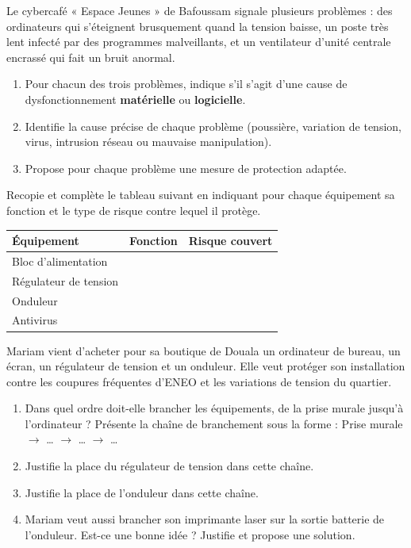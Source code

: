 \documentclass[11pt]{article}
\newcounter{popsec}
\newcounter{popsub}
\newcommand{\courssub}[1]{%
  \stepcounter{popsub}%
  \par\vspace{9pt}\noindent{\popxbold\fontsize{11.5}{13}\selectfont\color{popink}{\color{poporange}\thepopsec.\thepopsub}\hspace{6pt}#1}\par\nopagebreak\vspace{4pt}
}
\begin{document}
\courssub{Je m'entraîne}

\begin{exercice}
Le cybercafé « Espace Jeunes » de Bafoussam signale plusieurs problèmes : des ordinateurs qui s'éteignent brusquement quand la tension baisse, un poste très lent infecté par des programmes malveillants, et un ventilateur d'unité centrale encrassé qui fait un bruit anormal.
\begin{enumerate}
\item Pour chacun des trois problèmes, indique s'il s'agit d'une cause de dysfonctionnement \textbf{matérielle} ou \textbf{logicielle}.
\item Identifie la cause précise de chaque problème (poussière, variation de tension, virus, intrusion réseau ou mauvaise manipulation).
\item Propose pour chaque problème une mesure de protection adaptée.
\end{enumerate}
\end{exercice}

\begin{exercice}
Recopie et complète le tableau suivant en indiquant pour chaque équipement sa fonction et le type de risque contre lequel il protège.

\begin{center}
\begin{tabularx}{\linewidth}{|l|X|X|}
\hline
\rowcolor{popblueL} \textbf{Équipement} & \textbf{Fonction} & \textbf{Risque couvert} \\
\hline
Bloc d'alimentation & & \\
\hline
Régulateur de tension & & \\
\hline
Onduleur & & \\
\hline
Antivirus & & \\
\hline
\end{tabularx}
\end{center}
\end{exercice}

\begin{exercice}
Mariam vient d'acheter pour sa boutique de Douala un ordinateur de bureau, un écran, un régulateur de tension et un onduleur. Elle veut protéger son installation contre les coupures fréquentes d'ENEO et les variations de tension du quartier.
\begin{enumerate}
\item Dans quel ordre doit-elle brancher les équipements, de la prise murale jusqu'à l'ordinateur ? Présente la chaîne de branchement sous la forme : Prise murale $\rightarrow$ \ldots{} $\rightarrow$ \ldots{} $\rightarrow$ \ldots{}
\item Justifie la place du régulateur de tension dans cette chaîne.
\item Justifie la place de l'onduleur dans cette chaîne.
\item Mariam veut aussi brancher son imprimante laser sur la sortie batterie de l'onduleur. Est-ce une bonne idée ? Justifie et propose une solution.
\end{enumerate}
\end{exercice}
\end{document}
